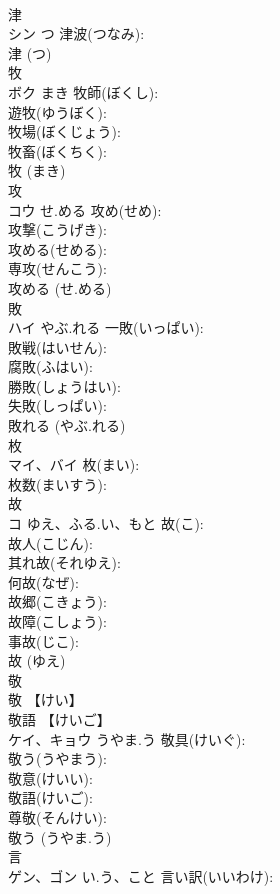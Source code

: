 \documentclass[8pt]{extreport}
\begin{document}
\begin{CJK}{UTF8}{min}
\\	津			
\\	シン	つ	津波(つなみ): 
\\	津 (つ)
\\	牧			
\\	ボク	まき	牧師(ぼくし): 
\\	遊牧(ゆうぼく): 
\\	牧場(ぼくじょう): 
\\	牧畜(ぼくちく): 
\\	牧 (まき)
\\	攻			
\\	コウ	せ.める	攻め(せめ): 
\\	攻撃(こうげき): 
\\	攻める(せめる): 
\\	専攻(せんこう): 
\\	攻める (せ.める)
\\	敗			
\\	ハイ	やぶ.れる	一敗(いっぱい): 
\\	敗戦(はいせん): 
\\	腐敗(ふはい): 
\\	勝敗(しょうはい): 
\\	失敗(しっぱい): 
\\	敗れる (やぶ.れる)
\\	枚			
\\	マイ、バイ		枚(まい): 
\\	枚数(まいすう): 
\\	故			
\\	コ	ゆえ、ふる.い、もと	故(こ): 
\\	故人(こじん): 
\\	其れ故(それゆえ): 
\\	何故(なぜ): 
\\	故郷(こきょう): 
\\	故障(こしょう): 
\\	事故(じこ): 
\\	故 (ゆえ)
\\	敬			
\\	敬 【けい】 
\\	敬語 【けいご】 
\\	ケイ、キョウ	うやま.う	敬具(けいぐ): 
\\	敬う(うやまう): 
\\	敬意(けいい): 
\\	敬語(けいご): 
\\	尊敬(そんけい): 
\\	敬う (うやま.う)
\\	言			
\\	ゲン、ゴン	い.う、こと	言い訳(いいわけ): 

\end{CJK}
\end{document}
